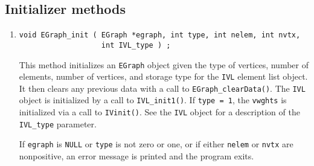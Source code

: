 \subsection{Initializer methods}
\label{subsection:EGraph:proto:initializers}
\par
\begin{enumerate}
\item
\begin{verbatim}
void EGraph_init ( EGraph *egraph, int type, int nelem, int nvtx,
                   int IVL_type ) ;
\end{verbatim}
This method initializes an {\tt EGraph} object given 
the type of vertices, number of elements, number of vertices,
and storage type for the {\tt IVL} element list object.
It then clears any previous data with a call to 
{\tt EGraph\_clearData()}. 
The {\tt IVL} object is initialized by a call to {\tt IVL\_init1()}.
If {\tt type = 1}, the {\tt vwghts} is initialized via a call to
{\tt IVinit()}.
See the {\tt IVL} object for a description of the {\tt IVL\_type}
parameter.
\par {}
If {\tt egraph} is {\tt NULL} or {\tt type} is not zero or one,
or if either {\tt nelem} or {\tt nvtx} are nonpositive,
an error message is printed and the program exits.
\end{enumerate}
\par
